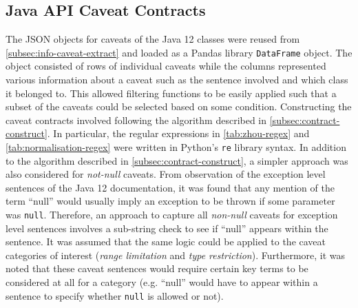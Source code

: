 \subsection{Java API Caveat Contracts}
\label{subsec:contract-caveat-contracts}
The JSON objects for caveats of the Java 12 classes were reused from \ref{subsec:info-caveat-extract} and loaded as a Pandas library \lstinline{DataFrame} object. The object consisted of rows of individual caveats while the columns represented various information about a caveat such as the sentence involved and which class it belonged to. This allowed filtering functions to be easily applied such that a subset of the caveats could be selected based on some condition. Constructing the caveat contracts involved following the algorithm described in \ref{subsec:contract-construct}. In particular, the regular expressions in \ref{tab:zhou-regex} and \ref{tab:normalisation-regex} were written in Python's \lstinline{re} library syntax. In addition to the algorithm described in \ref{subsec:contract-construct}, a simpler approach was also considered for \textit{not-null} caveats. From observation of the exception level sentences of the Java 12 documentation, it was found that any mention of the term ``null'' would usually imply an exception to be thrown if some parameter was \lstinline{null}. Therefore, an approach to capture all \textit{non-null} caveats for exception level sentences involves a sub-string check to see if ``null'' appears within the sentence. It was assumed that the same logic could be applied to the caveat categories of interest (\textit{range limitation} and \textit{type restriction}). Furthermore, it was noted that these caveat sentences would require certain key terms to be considered at all for a category (e.g. ``null'' would have to appear within a sentence to specify whether \lstinline{null} is allowed or not). 
